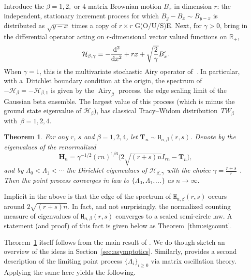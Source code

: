 \documentclass[pdftex]{sigma}
\numberwithin{equation}{section}
\newtheorem{Theorem}{Theorem}[section]
\theoremstyle{definition}
\newcommand{\R}{{\mathbb R}}
\newcommand{\HH}{\mathtt{H}_{n,\beta}}
\begin{document}
Introduce the $\beta =1,2,$ or $4$ matrix Brownian motion $B_x$ in dimension $r$:
 the independent, stationary increment process for which $B_y- B_x \sim B_{y-x}$ is distributed as $\sqrt{y-x}$ times a copy of $r \times r$ G(O/U/S)E.
 Next, for $\gamma > 0$, bring in the differential operator acting on $r$-dimensional vector valued functions on $\R_{+}$,
\begin{equation}\label{eq:H_op}
 \mathcal{H}_{\beta, \gamma} = - \frac{{\rm d}^2}{{\rm d}x^2} + rx + \sqrt{\frac{2}{\gamma}} B'_x.
\end{equation}
When $\gamma=1$, this is the multivariate stochastic Airy operator of~\cite{Spike2}. In particular, with a~Dirichlet boundary condition at the origin, the spectrum of $-\mathcal{H}_{\beta} = -\mathcal{H}_{\beta, 1}$ is given by the $\operatorname{Airy}_\beta$ process, the edge scaling limit of the Gaussian beta ensemble. The largest value of this process (which is minus the ground state eigenvalue of $\mathcal{H}_{\beta}$), has classical Tracy--Widom distribution~$TW_\beta$ with~$\beta =1,2, 4$.


\begin{Theorem}
\label{thm:limit_op}
For any $r$, $s$ and $\beta=1,2,4$,
let $\mathbf{T}_n \sim \HH(r,s)$. Denote by  the eigenvalues
of the renormalized
\begin{equation*}
\mathbf{H}_n = \gamma^{-1/2} (rn)^{1/6} \bigl(2 \sqrt{(r+s)n} {I}_{rn} - \mathbf{T}_n \bigr),
\end{equation*}
and by $\Lambda_0 < \Lambda_1 < \cdots$ the Dirichlet eigenvalues of
$ \mathcal{H}_{\beta, \gamma}$ with the choice $\gamma = \frac{r+s}{r}$ .
Then the point process  converges in law to $\{\Lambda_0, \Lambda_1, \dots \}
$ as $n\to \infty$.
\end{Theorem}




Implicit in the above is that the edge of the spectrum of $\HH(r,s)$ occurs around $2 \sqrt{(r+s) n}$. In fact, and not surprisingly, the normalized counting measure of eigenvalues of $\HH(r,s)$ converges to a scaled semi-circle law. A statement (and proof) of this fact is given below as Theorem~\ref{thm:eigcount}.


Theorem~\ref{thm:limit_op} itself follows from the main result of \cite{Spike2}. We do though sketch an overview of the ideas in Section~\ref{sec:asymptotics}. Similarly, \cite[Theorem~1.5]{Spike2} provides a second description of the limiting point process $\{ \Lambda_i \}_{i \ge 0}$ via matrix oscillation theory. Applying the same here yields the following.
\end{document}
